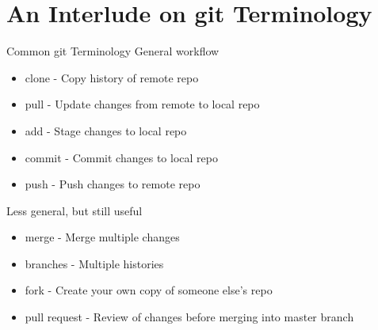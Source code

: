 \documentclass{beamer}
\begin{document}
    \section{An Interlude on git Terminology}\label{sec:an-interlude-on-git-terminology}
    \begin{frame}{Common git Terminology}
        General workflow
        \begin{itemize}
            \item clone - Copy history of remote repo
            \item pull - Update changes from remote to local repo
            \item add - Stage changes to local repo
            \item commit - Commit changes to local repo
            \item push - Push changes to remote repo
        \end{itemize}

        Less general, but still useful
        \begin{itemize}
            \item merge - Merge multiple changes
            \item branches - Multiple histories
            \item fork - Create your own copy of someone else's repo
            \item pull request - Review of changes before merging into master branch
        \end{itemize}
    \end{frame}
\end{document}
